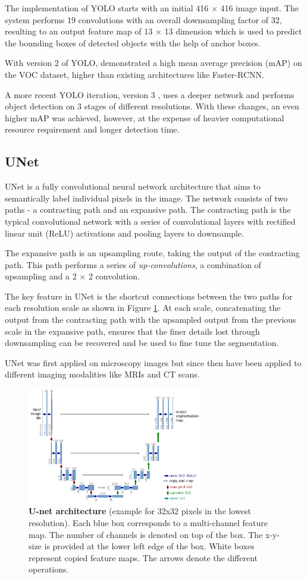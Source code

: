 \documentclass[journal]{IEEEtran}
\begin{document}
The implementation of YOLO starts with an initial 416 $\times$ 416 image input. The system performs 19 convolutions with an overall downsampling factor of 32, resulting to an output feature map of 13 $\times$ 13 dimension which is used to predict the bounding boxes of detected objects with the help of anchor boxes.

With version 2 of YOLO, \cite{redmon2016yolo9000} demonstrated a high mean average precision (mAP) on the VOC dataset, higher than existing architectures like Faster-RCNN.

A more recent YOLO iteration, version 3 \cite{yolov3}, uses a deeper network and performs object detection on 3 stages of different resolutions. With these changes, an even higher mAP was achieved, however, at the expense of heavier computational resource requirement and longer detection time.
\subsection{UNet}
UNet\cite{RFB15a} is a fully convolutional neural network architecture that aims to semantically label individual pixels in the image. The network consists of two paths - a contracting path and an expansive path. The contracting path is the typical convolutional network with a series of convolutional layers with rectified linear unit (ReLU) activations and pooling layers to downsample.

The expansive path is an upsampling route, taking the output of the contracting path. This path performs a series of \textit{up-convolutions}, a combination of upsampling and a 2 $\times$ 2 convolution.

The key feature in UNet is the shortcut connections between the two paths for each resolution scale as shown in Figure \ref{fig:unet}. At each scale, concatenating the output from the contracting path with the upsampled output from the previous scale in the expansive path, ensures that the finer details lost through downsampling can be recovered and be used to fine tune the segmentation.

UNet was first applied on microscopy images but since then have been applied to different imaging modalities like MRIs and CT scans.
\begin{figure}
\centering
\includegraphics[width=3in]{unet.png}
\caption{\textbf{U-net architecture} \cite{RFB15a} (example for 32x32 pixels in the lowest resolution). Each blue
box corresponds to a multi-channel feature map. The number of channels is denoted
on top of the box. The x-y-size is provided at the lower left edge of the box. White
boxes represent copied feature maps. The arrows denote the different operations.}
\label{fig:unet}
\end{figure}
\end{document}
